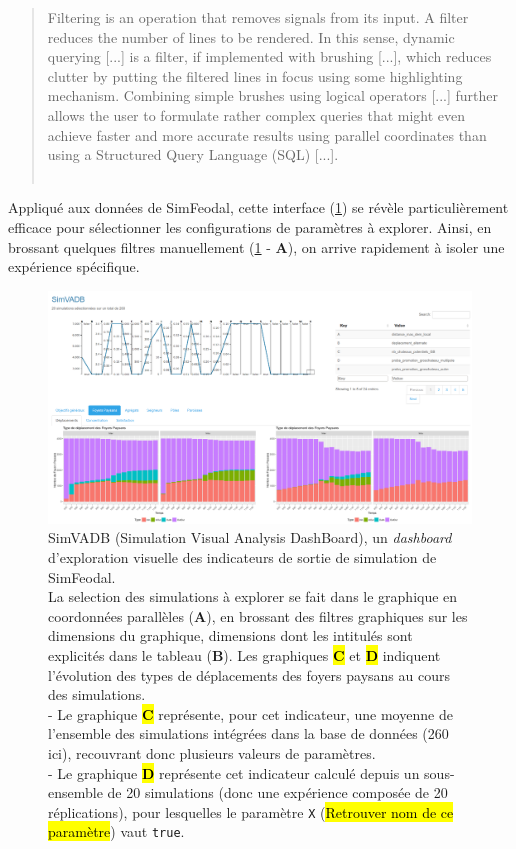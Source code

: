 	\begin{quotation}
		\og Filtering is an operation that removes signals from its input. A filter reduces the number of lines to be rendered. In 	this sense, dynamic querying [...] is a filter, if implemented with brushing [...], which reduces clutter by putting the filtered lines in focus using some highlighting mechanism. Combining simple brushes using logical operators [...] further allows the user to formulate rather complex queries that might even achieve faster and more accurate results using parallel coordinates than using a Structured Query Language (SQL) [...].\fg{}\\
		\mbox{}~ \hfill \cite[p. 13]{heinrich_state_2013}
	\end{quotation}

	Appliqué aux données de SimFeodal, cette interface (\cref{fig:simvadb_dashboard}) se révèle particulièrement efficace pour sélectionner les configurations de paramètres à explorer.
	Ainsi, en \og brossant \fg{} quelques filtres manuellement (\cref{fig:simvadb_dashboard} - \textbf{A}), on arrive rapidement à isoler une expérience spécifique.

	\begin{figure}[H]
		\captionsetup{width=\linewidth}
		\includegraphics[width=\linewidth]{img/SimVADB_Dashboard2.png}
		\caption{SimVADB (Simulation Visual Analysis DashBoard), un \textit{dashboard} d'exploration visuelle des indicateurs de sortie de simulation de SimFeodal.\\
		La selection des simulations à explorer se fait dans le graphique en coordonnées parallèles (\textbf{A}), en \og brossant\fg{} des filtres graphiques sur les \og dimensions\fg{} du graphique, dimensions dont les intitulés sont explicités dans le tableau (\textbf{B}).
		Les graphiques \hl{\textbf{C}} et \hl{\textbf{D}} indiquent l'évolution des types de déplacements des foyers paysans au cours des simulations.\\
		- Le graphique \hl{\textbf{C}} représente, pour cet indicateur, une moyenne de l'ensemble des simulations intégrées dans la base de données (260 ici), recouvrant donc plusieurs valeurs de paramètres.\\
		- Le graphique \hl{\textbf{D}} représente cet indicateur calculé depuis un sous-ensemble de 20 simulations (donc une expérience composée de 20 réplications), pour lesquelles le paramètre \og \texttt{X} \fg{}(\hl{Retrouver nom de ce paramètre}) vaut \texttt{true}.}
		\label{fig:simvadb_dashboard}
	\end{figure}

